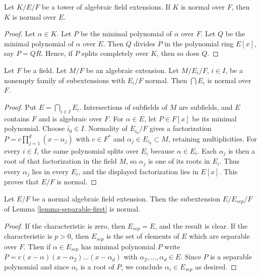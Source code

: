 \begin{lemma}
\label{lemma-normal-goes-up}
Let $K/E/F$ be a tower of algebraic field extensions.
If $K$ is normal over $F$, then $K$ is normal over $E$.
\end{lemma}

\begin{proof}
Let $\alpha \in K$. Let $P$ be the minimal polynomial of $\alpha$ over $F$.
Let $Q$ be the minimal polynomial of $\alpha$ over $E$.
Then $Q$ divides $P$ in the polynomial ring $E[x]$, say $P = QR$.
Hence, if $P$ splits completely over $K$, then so does $Q$.
\end{proof}

\begin{lemma}
\label{lemma-intersect-normal}
Let $F$ be a field. Let $M/F$ be an algebraic extension. Let
$M/E_i/F$, $i \in I$, be a nonempty family of subextensions with
$E_i/F$ normal. Then $\bigcap E_i$ is normal over $F$.
\end{lemma}

\begin{proof}
Put $E = \bigcap_{i \in I} E_i$. Intersections of subfields of $M$
are subfields, and $E$ contains $F$ and is algebraic over $F$.
For $\alpha \in E$, let $P \in F[x]$ be its minimal polynomial.
Choose $i_0 \in I$. Normality of $E_{i_0}/F$ gives a factorization
$P = c\prod_{j=1}^d(x-\alpha_j)$ with $c \in F^*$ and
$\alpha_j \in E_{i_0} \subset M$, retaining multiplicities.
For every $i \in I$, the same polynomial splits over $E_i$ because
$\alpha \in E_i$. Each $\alpha_j$ is then a root of that factorization
in the field $M$, so $\alpha_j$ is one of its roots in $E_i$.
Thus every $\alpha_j$ lies in every $E_i$, and the displayed
factorization lies in $E[x]$. This proves that $E/F$ is normal.
\end{proof}

\begin{lemma}
\label{lemma-separable-first-normal}
Let $E/F$ be a normal algebraic field extension. Then the subextension
$E/E_{sep}/F$ of Lemma \ref{lemma-separable-first} is normal.
\end{lemma}

\begin{proof}
If the characteristic is zero, then $E_{sep} = E$, and the result
is clear. If the characteristic is $p > 0$, then $E_{sep}$
is the set of elements of $E$ which are separable over $F$.
Then if $\alpha \in E_{sep}$ has minimal polynomial $P$
write $P = c(x - \alpha)(x - \alpha_2) \ldots (x - \alpha_d)$
with $\alpha_2, \ldots, \alpha_d \in E$. Since
$P$ is a separable polynomial and since $\alpha_i$
is a root of $P$, we conclude $\alpha_i \in E_{sep}$ as desired.
\end{proof}

